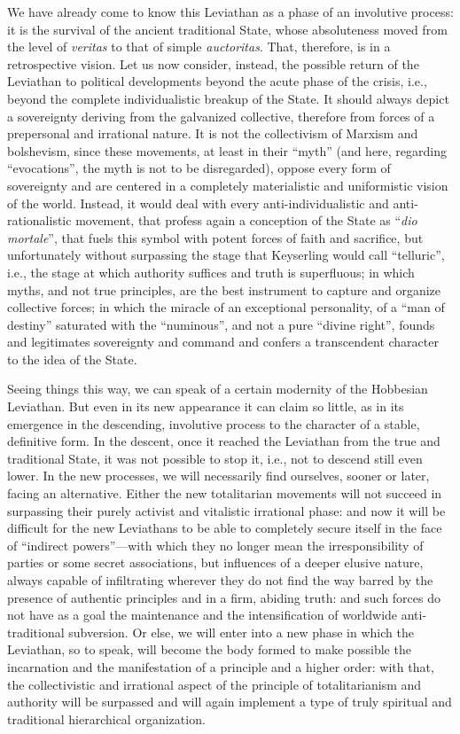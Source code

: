 We have already come to know this Leviathan as a phase of an involutive process: it is the survival of the ancient traditional State, whose absoluteness moved from the level of \emph{veritas} to that of simple \emph{auctoritas}. That, therefore, is in a retrospective vision. Let us now consider, instead, the possible return of the Leviathan to political developments beyond the acute phase of the crisis, i.e., beyond the complete individualistic breakup of the State. It should always depict a sovereignty deriving from the galvanized collective, therefore from forces of a prepersonal and irrational nature. It is not the collectivism of Marxism and bolshevism, since these movements, at least in their ``myth'' (and here, regarding ``evocations'', the myth is not to be disregarded), oppose every form of sovereignty and are centered in a completely materialistic and uniformistic vision of the world. Instead, it would deal with every anti-individualistic and anti-rationalistic movement, that profess again a conception of the State as ``\emph{dio mortale}'', that fuels this symbol with potent forces of faith and sacrifice, but unfortunately without surpassing the stage that Keyserling would call ``telluric'', i.e., the stage at which authority suffices and truth is superfluous; in which myths, and not true principles, are the best instrument to capture and organize collective forces; in which the miracle of an exceptional personality, of a ``man of destiny'' saturated with the ``numinous'', and not a pure ``divine right'', founds and legitimates sovereignty and command and confers a transcendent character to the idea of the State.

Seeing things this way, we can speak of a certain modernity of the Hobbesian Leviathan. But even in its new appearance it can claim so little, as in its emergence in the descending, involutive process to the character of a stable, definitive form. In the descent, once it reached the Leviathan from the true and traditional State, it was not possible to stop it, i.e., not to descend still even lower. In the new processes, we will necessarily find ourselves, sooner or later, facing an alternative. Either the new totalitarian movements will not succeed in surpassing their purely activist and vitalistic irrational phase: and now it will be difficult for the new Leviathans to be able to completely secure itself in the face of ``indirect powers''---with which they no longer mean the irresponsibility of parties or some secret associations, but influences of a deeper elusive nature, always capable of infiltrating wherever they do not find the way barred by the presence of authentic principles and in a firm, abiding truth: and such forces do not have as a goal the maintenance and the intensification of worldwide anti-traditional subversion. Or else, we will enter into a new phase in which the Leviathan, so to speak, will become the body formed to make possible the incarnation and the manifestation of a principle and a higher order: with that, the collectivistic and irrational aspect of the principle of totalitarianism and authority will be surpassed and will again implement a type of truly spiritual and traditional hierarchical organization.

